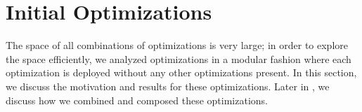 \section{Initial Optimizations}\label{sec:opt}
The space of all combinations of optimizations is very large; in order to
explore the space efficiently, we analyzed optimizations in a modular fashion
where each optimization is deployed without any other optimizations present. In
this section, we discuss the motivation and results for these optimizations.
Later in , we discuss how we combined and composed these
optimizations.

